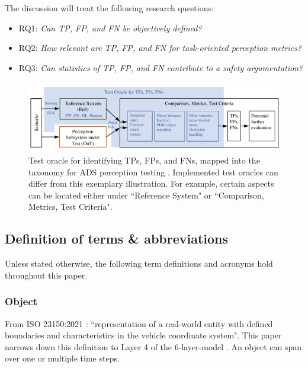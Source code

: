 \documentclass[conference]{IEEEtran}
\begin{document}
The discussion will treat the following research questions:
\begin{itemize}


\item {RQ1}: \textit{Can TP, FP, and FN be objectively defined?}

\item {RQ2}: \textit{How relevant are TP, FP, and FN for task-oriented perception metrics?}

\item {RQ3}: \textit{Can statistics of TP, FP, and FN contribute to a safety argumentation?}
\end{itemize}

\begin{figure}[t]
	\centering
	\vspace*{2mm}
	\includegraphics[width=\textwidth]{img/taxonomy_with_oracle.pdf}
	
	\caption{Test oracle for identifying TPs, FPs, and FNs, mapped into the taxonomy for ADS perception testing \cite{Hoss2022review, stellet2015testing}. Implemented test oracles can differ from this exemplary illustration. For example, certain aspects can be located either under ``Reference System" or ``Comparison, Metrics, Test Criteria".
	}
	\label{fig:oracle_in_taxonomy}
\end{figure}


\subsection{Definition of terms \& abbreviations}
Unless stated otherwise, the following term definitions and acronyms hold throughout this paper.

\subsubsection{Object} \label{def:object}
From ISO 23150:2021 \cite{ISO_23150_2021_data_communication}: 
``representation of a real-world entity with defined boundaries and characteristics in the vehicle coordinate system".
This paper narrows down this definition to Layer 4 of the 6-layer-model \cite{Scholtes20216lmAccess}. An object can span over one or multiple time steps. 
\end{document}
